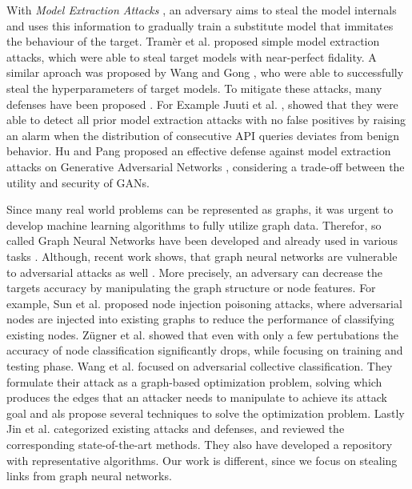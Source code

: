   With \emph{Model Extraction Attacks} \cite{atli2020extraction, juuti2019prada, tramer2016stealing}, an adversary aims to steal the model internals and uses this information to gradually train a substitute model that immitates the behaviour of the target.
  Tramèr et al. \cite{tramer2016stealing} proposed simple model extraction attacks, which were able to steal target models with near-perfect fidality.
  A similar aproach was proposed by Wang and Gong \cite{8418595}, who were able to successfully steal the hyperparameters of target models.
  To mitigate these attacks, many defenses have been proposed \cite{juuti2019prada, hu2021model, 272262, mori2021bodame}.
  For Example Juuti et al. \cite{juuti2019prada}, showed that they were able to detect all prior model extraction attacks with no false positives by raising an alarm when the distribution of consecutive API queries deviates from benign behavior.
  Hu and Pang \cite{hu2021model} proposed an effective defense against model extraction attacks on Generative Adversarial Networks \cite{goodfellow2014generative}, considering a trade-off between the utility and security of GANs.

  Since many real world problems can be represented as graphs, it was urgent to develop machine learning algorithms to fully utilize graph data.
  Therefor, so called Graph Neural Networks have been developed and already used in various tasks \cite{4700287, atwood2016diffusionconvolutional, kipf2017semisupervised, velickovic2018graph}.
  Although, recent work shows, that graph neural networks are vulnerable to adversarial attacks as well \cite{agbcvmtgs, 10.1145/3366423.3380149, Z_gner_2018, Z_gner_2018, jin2020adversarial}.
  More precisely, an adversary can decrease the targets accuracy by manipulating the graph structure or node features.
  For example, Sun et al. \cite{10.1145/3366423.3380149} proposed node injection poisoning attacks, where adversarial nodes are injected into existing graphs to reduce the performance of classifying existing nodes.
  Zügner et al. \cite{Z_gner_2018} showed that even with only a few pertubations the accuracy of node classification significantly drops, while focusing on training and testing phase.
  Wang et al. \cite{agbcvmtgs} focused on adversarial collective classification.
  They formulate their attack as a graph-based optimization problem, solving which produces the edges that an attacker needs to manipulate to achieve its attack goal and als propose several techniques to solve the optimization problem.
  Lastly Jin et al. \cite{jin2020adversarial} categorized existing attacks and defenses, and reviewed the corresponding state-of-the-art methods. They also have developed a repository with representative algorithms.
  Our work is different, since we focus on stealing links from graph neural networks.

